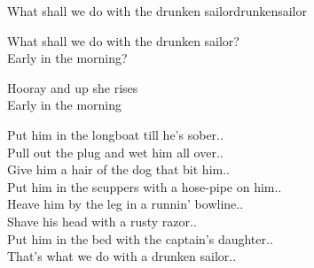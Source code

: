\begin{song}{What shall we do with the drunken sailor}{drunkensailor}
\begin{vers}
\repopen What shall we do with the drunken sailor? \repclose\\
Early in the morning?\\
\end{vers}
\begin{vers}
\repopen Hooray and up she rises \repclose\\
Early in the morning\\
\end{vers}
\begin{vers}
Put him in the longboat till he's sober..\\
Pull out the plug and wet him all over..\\
Give him a hair of the dog that bit him..\\
Put him in the scuppers with a hose-pipe on him..\\
Heave him by the leg in a runnin' bowline..\\
Shave his head with a rusty razor..\\
Put him in the bed with the captain's daughter..\\
That's what we do with a drunken sailor..\\
\end{vers}
\end{song}
